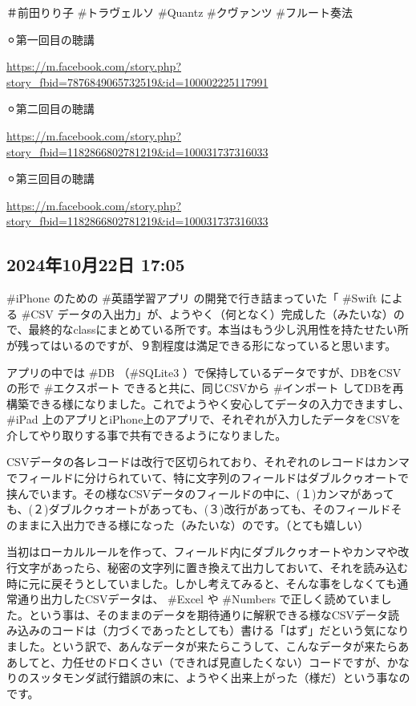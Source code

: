 ＃前田りり子 \#トラヴェルソ \#Quantz \#クヴァンツ \#フルート奏法

⚪︎第一回目の聴講

\url{https://m.facebook.com/story.php?story_fbid=7876849065732519&id=100002225117991}

⚪︎第二回目の聴講

\url{https://m.facebook.com/story.php?story_fbid=1182866802781219&id=100031737316033}

⚪︎第三回目の聴講

\url{https://m.facebook.com/story.php?story_fbid=1182866802781219&id=100031737316033}

\subsection*{2024年10月22日 17:05}

\#iPhone のための \#英語学習アプリ の開発で行き詰まっていた「 \#Swift による \#CSV データの入出力」が、ようやく（何となく）完成した（みたいな）ので、最終的なclassにまとめている所です。本当はもう少し汎用性を持たせたい所が残ってはいるのですが、９割程度は満足できる形になっていると思います。

アプリの中では \#DB （\#SQLite3 ）で保持しているデータですが、DBをCSVの形で \#エクスポート できると共に、同じCSVから \#インポート してDBを再構築できる様になりました。これでようやく安心してデータの入力できますし、 \#iPad 上のアプリとiPhone上のアプリで、それぞれが入力したデータをCSVを介してやり取りする事で共有できるようになりました。

CSVデータの各レコードは改行で区切られており、それぞれのレコードはカンマでフィールドに分けられていて、特に文字列のフィールドはダブルクゥオートで挟んでいます。その様なCSVデータのフィールドの中に、(１)カンマがあっても、(２)ダブルクゥオートがあっても、(３)改行があっても、そのフィールドそのままに入出力できる様になった（みたいな）のです。（とても嬉しい）

当初はローカルルールを作って、フィールド内にダブルクゥオートやカンマや改行文字があったら、秘密の文字列に置き換えて出力しておいて、それを読み込む時に元に戻そうとしていました。しかし考えてみると、そんな事をしなくても通常通り出力したCSVデータは、 \#Excel や \#Numbers で正しく読めていました。という事は、そのままのデータを期待通りに解釈できる様なCSVデータ読み込みのコードは（力づくであったとしても）書ける「はず」だという気になりました。という訳で、あんなデータが来たらこうして、こんなデータが来たらああしてと、力任せのドロくさい（できれば見直したくない）コードですが、かなりのスッタモンダ試行錯誤の末に、ようやく出来上がった（様だ）という事なのです。

